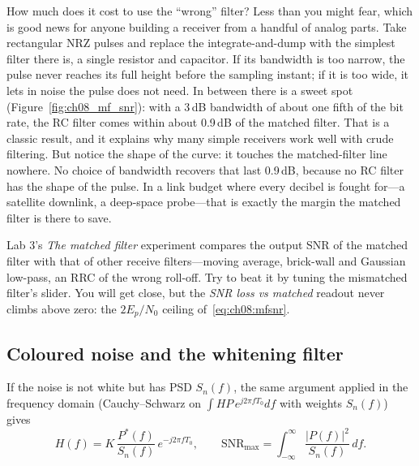 How much does it cost to use the ``wrong'' filter? Less than you might fear, which is good news
for anyone building a receiver from a handful of analog parts. Take rectangular NRZ pulses and
replace the integrate-and-dump with the simplest filter there is, a single resistor and
capacitor. If its bandwidth is too narrow, the pulse never reaches its full height before the
sampling instant; if it is too wide, it lets in noise the pulse does not need. In between there
is a sweet spot (Figure~\ref{fig:ch08_mf_snr}): with a 3\,dB bandwidth of about one fifth of
the bit rate, the RC filter comes within about 0.9\,dB of the matched filter. That is a classic
result, and it explains why many simple receivers work well with crude filtering. But notice
the shape of the curve: it touches the matched-filter line nowhere. No choice of bandwidth
recovers that last 0.9\,dB, because no RC filter has the shape of the pulse. In a link budget
where every decibel is fought for---a satellite downlink, a deep-space probe---that is
exactly the margin the matched filter is there to save.

\begin{tryit}
Lab 3's \emph{The matched filter} experiment compares the output SNR of the matched filter with
that of other receive filters---moving average, brick-wall and Gaussian low-pass, an RRC of the
wrong roll-off. Try to beat it by tuning the mismatched filter's slider. You will get close, but the
\emph{SNR loss vs matched} readout never climbs above zero: the $2E_p/N_0$ ceiling
of~\eqref{eq:ch08:mfsnr}.
\end{tryit}


\subsection{Coloured noise and the whitening filter}

If the noise is not white but has PSD $S_n(f)$, the same argument applied in the frequency
domain (Cauchy--Schwarz on $\int H P\,e^{j2\pi fT_0}df$ with weights $S_n(f)$) gives
\begin{equation}
H(f)=K\,\frac{P^*(f)}{S_n(f)}\,e^{-j2\pi fT_0},\qquad
\mathrm{SNR}_{\max}=\int_{-\infty}^{\infty}\frac{|P(f)|^2}{S_n(f)}\,df.
\label{eq:ch08:coloured}
\end{equation}

